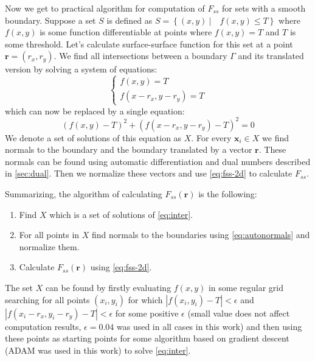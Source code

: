 \documentclass[1p]{elsarticle}
\begin{document}
Now we get to practical algorithm for computation of $F_{ss}$ for sets with a
smooth boundary. Suppose a set $S$ is defined as
$S = \left\{ (x, y) \ | \quad f(x, y) \le T \right\}$ where $f(x, y)$ is some
function differentiable at points where $f(x, y) = T$ and $T$ is some
threshold. Let's calculate surface-surface function for this set at a point
$\bm{r} = (r_x, r_y)$. We find all intersections between a boundary $\Gamma$ and
its translated version by solving a system of equations:
\begin{equation}
  \left\{
  \begin{array}{l}
    f(x, y) = T \\
    f(x-r_x, y-r_y) = T
  \end{array}
  \right.
\end{equation}
which can now be replaced by a single equation:
\begin{equation}
  (f(x, y) - T)^2 + (f(x-r_x, y-r_y) - T)^2 = 0 \label{eq:inter}
\end{equation}
We denote a set of solutions of this equation as $X$. For every $\bm{x}_i \in X$
we find normals to the boundary and the boundary translated by a vector
$\bm{r}$. These normals can be found using automatic differentiation and dual
numbers described in \ref{sec:dual}. Then we normalize these vectors and use
\cref{eq:fss-2d} to calculate $F_{ss}$.

Summarizing, the algorithm of calculating $F_{ss}(\bm{r})$ is the following:
\begin{enumerate}
\item Find $X$ which is a set of solutions of \cref{eq:inter}.
\item For all points in $X$ find normals to the boundaries using
  \cref{eq:autonormals} and normalize them.
\item Calculate $F_{ss}(\bm{r})$ using \cref{eq:fss-2d}.
\end{enumerate}

The set $X$ can be found by firstly evaluating $f(x, y)$ in some regular grid
searching for all points $(x_i, y_i)$ for which $|f(x_i, y_i) - T| < \epsilon$
and $|f(x_i - r_x, y_i - r_y) - T| < \epsilon$ for some positive $\epsilon$ 
(small value does not affect computation results, $\epsilon=0.04$ was used in
all cases in this work) and then using these points as starting points for some
algorithm based on gradient descent (ADAM \cite{adam} was used in this work) to
solve \cref{eq:inter}.
\end{document}
